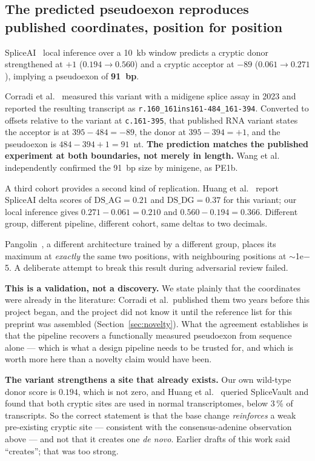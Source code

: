 \documentclass[11pt,a4paper]{article}
\begin{document}
\subsection{The predicted pseudoexon reproduces published coordinates, position for position}
\label{sec:coordinates}

SpliceAI~\cite{jaganathan2019} local inference over a 10~kb window predicts a cryptic donor
strengthened at $+1$ ($0.194 \rightarrow 0.560$) and a cryptic acceptor at $-89$
($0.061 \rightarrow 0.271$), implying a pseudoexon of \textbf{91~bp}.

Corradi et al.~\cite{corradi2023} measured this variant with a midigene splice assay in 2023 and
reported the resulting transcript as
\texttt{r.160\_161ins161-484\_161-394}. Converted to offsets relative to the variant at
\texttt{c.161-395}, that published RNA variant states the acceptor is at $395-484 = -89$, the donor
at $395-394 = +1$, and the pseudoexon is $484-394+1 = 91$~nt. \textbf{The prediction matches the
published experiment at both boundaries, not merely in length.} Wang et al.~\cite{wang2025}
independently confirmed the 91~bp size by minigene, as PE1b.

A third cohort provides a second kind of replication. Huang et al.~\cite{huang2025} report SpliceAI
delta scores of $\mathrm{DS\_AG} = 0.21$ and $\mathrm{DS\_DG} = 0.37$ for this variant; our local
inference gives $0.271-0.061 = 0.210$ and $0.560-0.194 = 0.366$. Different group, different
pipeline, different cohort, same deltas to two decimals.

Pangolin~\cite{zeng2022}, a different architecture trained by a different group, places its maximum
at \emph{exactly} the same two positions, with neighbouring positions at $\sim$1e$-$5. A deliberate
attempt to break this result during adversarial review failed.

\textbf{This is a validation, not a discovery.} We state plainly that the coordinates were already
in the literature: Corradi et al.\ published them two years before this project began, and the
project did not know it until the reference list for this preprint was assembled
(Section~\ref{sec:novelty}). What the agreement establishes is that the pipeline recovers a
functionally measured pseudoexon from sequence alone --- which is what a design pipeline needs to
be trusted for, and which is worth more here than a novelty claim would have been.

\textbf{The variant strengthens a site that already exists.} Our own wild-type donor score is
$0.194$, which is not zero, and Huang et al.~\cite{huang2025} queried SpliceVault and found that
both cryptic sites are used in normal transcriptomes, below 3\,\% of transcripts. So the correct
statement is that the base change \emph{reinforces} a weak pre-existing cryptic site --- consistent
with the consensus-adenine observation above --- and not that it creates one \emph{de novo}. Earlier
drafts of this work said ``creates''; that was too strong.
\end{document}
